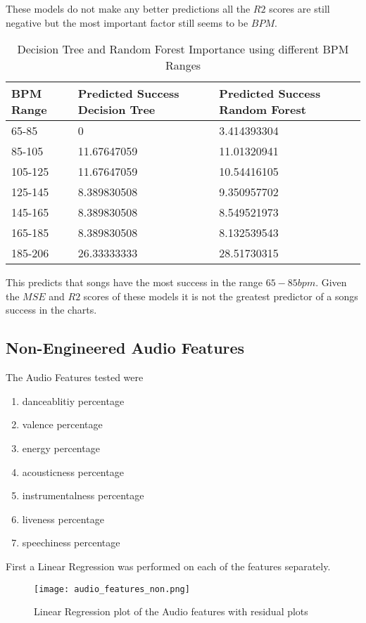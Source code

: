 \documentclass[titlepage]{article}
\begin{document}
\noindent These models do not make any better predictions all the $R2$ scores are still negative but the most important factor still seems to be $BPM$. 

\begin{table}[H]
    \centering 
    \caption{Decision Tree and Random Forest Importance using different BPM Ranges}
    \begin{tabular}{lll}
    \hline
        BPM Range & Predicted Success Decision Tree & Predicted Success Random Forest \\ \hline
        65-85 & 0 & 3.414393304 \\ 
        85-105 & 11.67647059 & 11.01320941 \\ 
        105-125 & 11.67647059 & 10.54416105 \\ 
        125-145 & 8.389830508 & 9.350957702 \\ 
        145-165 & 8.389830508 & 8.549521973 \\ 
        165-185 & 8.389830508 & 8.132539543 \\ 
        185-206 & 26.33333333 & 28.51730315 \\ \hline
    \end{tabular}
\end{table} 
 This predicts that songs have the most success in the range $65-85 bpm$. Given the $MSE$ and $R2$ scores of these models it is not the greatest predictor of a songs success in the charts.  


\subsection*{Non-Engineered Audio Features} 
\noindent The Audio Features tested were 
\begin{enumerate}
    \item danceablitiy percentage 
    \item valence percentage 
    \item energy percentage 
    \item acousticness percentage 
    \item instrumentalness percentage 
    \item liveness percentage 
    \item speechiness percentage 
\end{enumerate}

\noindent First a Linear Regression was performed on each of the features separately. 
\begin{figure}[H]
    \centering
    \texttt{[image: audio\_features\_non.png]}
    \caption{Linear Regression plot of the Audio features with residual plots}
    \label{fig:enter-label}
\end{figure} 
\end{document}
